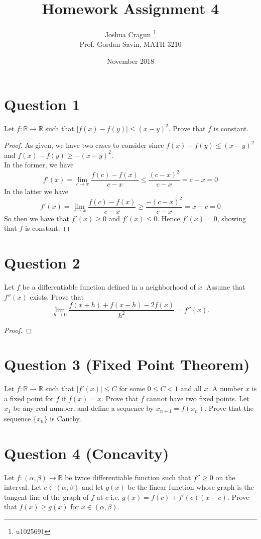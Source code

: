 \documentclass[12pt, letterpaper]{article}
\title{Homework Assignment 4}
\author{Joshua Cragun \thanks{u1025691} \\ Prof. Gordan Savin, MATH 3210}
\date{November 2018}
\begin{document}
\begin{titlepage}
\maketitle
\end{titlepage}

\section*{Question 1}
Let $f: \mathbb R \rightarrow \mathbb R$ such that $|f(x)-f(y)| \leq (x-y)^2$. Prove that $f$ is constant.

\begin{proof}
  As given, we have two cases to consider since $f(x)-f(y) \leq (x-y)^2$ and $f(x)-f(y) \geq -(x-y)^2$.\\

  \noindent In the former, we have
  $$ f'(x) = \lim_{c \to x} \frac{f(c) - f(x)}{c - x} \leq \frac{(c-x)^2}{c-x} = c-x = 0$$
  \noindent In the latter we have
  $$ f'(x) = \lim_{c \to x} \frac{f(c) - f(x)}{c - x} \geq \frac{-(c-x)^2}{c-x} = x-c = 0$$
  So then we have that $f'(x) \geq 0$ and $f'(x) \leq 0$. Hence $f'(x) = 0$, showing that $f$ is constant.
\end{proof}

\section*{Question 2}
Let $f$ be a differentiable function defined in a neighborhood of $x$. Assume  that $f''(x)$ exists. Prove that
\[
\lim_{h\rightarrow 0} \frac{f(x+h) + f(x-h) -2 f(x)}{h^2} = f''(x).
\]

\begin{proof}
  
\end{proof}
\section*{Question 3 (Fixed Point Theorem)}
Let $f: \mathbb R \rightarrow \mathbb R$ such that $|f'(x)| \leq C$ for some $0\leq C< 1$ and all $x$.  A number $x$ is a fixed point for $f$ if
$f(x)=x$. Prove that $f$ cannot have two fixed points.
Let $x_1$ be any real number, and define
a sequence by $x_{n+1}=f(x_n)$. Prove that the sequence $\{x_n\}$ is Cauchy.
\section*{Question 4 (Concavity)}
Let $f: (\alpha,\beta)  \rightarrow \mathbb R$ be twice differentiable function such that $f''\geq 0$ on the interval. Let $c\in (\alpha,\beta)$ and let $g(x)$ be the linear
function whose graph is the tangent line of the graph of $f$ at $c$ i.e. $g(x)=f(c) + f'(c)(x-c)$. Prove that $f(x)\geq g(x)$ for $x\in (\alpha,\beta)$.
\end{document}
